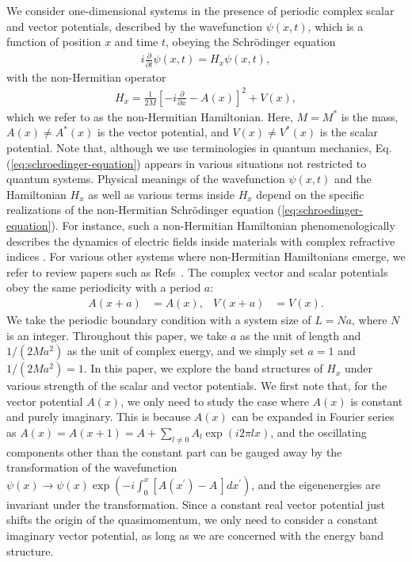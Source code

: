 \documentclass[prb,superscriptaddress,floatfix,twocolumn,showpacs]{revtex4-2}
\begin{document}
We consider one-dimensional systems in the presence of periodic complex scalar and vector potentials, described by the wavefunction $\psi (x,t)$, which is a function of position $x$ and time $t$, obeying the Schr\"odinger equation
\begin{align}
    i\frac{\partial}{\partial t}\psi (x,t) = H_x \psi (x,t), 
    \label{eq:schroedinger-equation}
\end{align}
with the non-Hermitian operator
\begin{align}
    H_x = \frac{1}{2M}\left[-i\frac{\partial}{\partial x}-A(x)\right]^2+V(x),
    \label{eq:hamiltonian}
\end{align}
which we refer to as the non-Hermitian Hamiltonian. 
Here, $M=M^\ast$ is the mass, $A(x) \neq A^\ast (x)$ is the vector potential, and $V(x) \neq V^\ast(x)$ is the scalar potential.  
Note that, although we use terminologies in quantum mechanics, Eq. (\ref{eq:schroedinger-equation}) appears in various situations not restricted to quantum systems. 
Physical meanings of the wavefunction $\psi (x,t)$ and the Hamiltonian $H_x$ as well as various terms inside $H_x$ depend on the specific realizations of the non-Hermitian Schr\"odinger equation (\ref{eq:schroedinger-equation}).
For instance, such a non-Hermitian Hamiltonian phenomenologically describes the dynamics of electric fields inside materials with complex refractive indices \cite{makris2008beam,
guo2009observation,
yokomizo2021non}. 
For various other systems where non-Hermitian Hamiltonians emerge, we refer to review papers such as Refs~\cite{bender2007making,ashida2020non,bergholtz2021exceptional}. 
The complex vector and scalar potentials obey the same periodicity with a period $a$:
\begin{align}
    A(x+a) &= A(x),& V(x+a) &= V(x).
    \label{eq:periodic-potential}
\end{align}
We take the periodic boundary condition with a system size of $L=Na$, where $N$ is an integer. 
Throughout this paper, we take $a$ as the unit of length and $1/(2Ma^2)$ as the unit of complex energy, and we simply set $a=1$ and $1/(2Ma^2) = 1$.
In this paper, we explore the band structures of $H_x$ under various strength of the scalar and vector potentials.
We first note that, for the vector potential $A(x)$, we only need to study the case where $A(x)$ is constant and purely imaginary. 
This is because $A(x)$ can be expanded in Fourier series as $A(x)=A(x+1)=A+\sum_{l\neq0}A_l\exp(i2\pi lx)$, and the oscillating components other than the constant part can be gauged away by the transformation of the wavefunction $\psi (x)\rightarrow\psi (x)\exp\left(-i\int^x_0[A(x^\prime)-A\,]dx^\prime\right)$, and the eigenenergies are invariant under the transformation. 
Since a constant real vector potential just shifts the origin of the quasimomentum, we only need to consider a constant imaginary vector potential, as long as we are concerned with the energy band structure.
\end{document}

